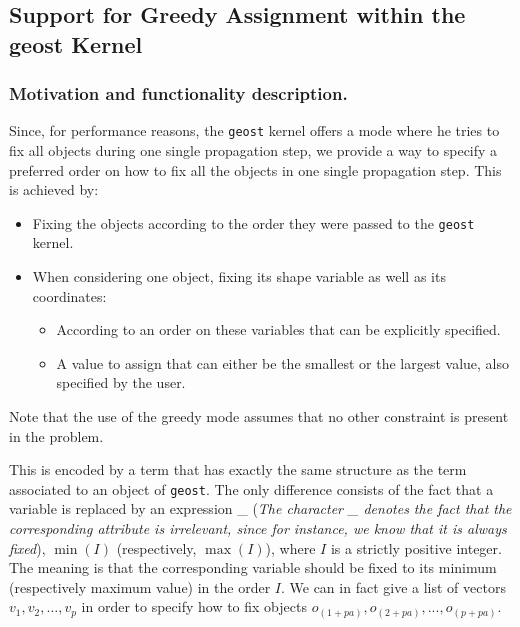 \subsection{Support for Greedy Assignment within the geost Kernel}\label{geostdescription:supportforgreedyassignmentwithinthegeostkernel}\hypertarget{geostdescription:supportforgreedyassignmentwithinthegeostkernel}{}

\subsubsection{Motivation and functionality description.}\label{geostdescription:motivationandfunctionalitydescription}\hypertarget{geostdescription:motivationandfunctionalitydescription}{}
Since, for performance reasons, the \texttt{geost} kernel offers a mode where he tries to fix all objects during one single propagation step, we provide a way to specify a preferred order on how to fix all the objects in one single propagation step. This is achieved by:
\begin{itemize}
	\item Fixing the objects according to the order they were passed to the \texttt{geost} kernel.
	\item When considering one object, fixing its shape variable as well as its coordinates:
	\begin{itemize}
		\item According to an order on these variables that can be explicitly specified.
		\item A value to assign that can either be the smallest or the largest value, also specified by the user.
	\end{itemize}
\end{itemize}

\begin{note}
Note that the use of the greedy mode assumes that no other constraint is present in the problem.
\end{note}

	This is encoded by a term that has exactly the same structure as the term associated to an object of  \texttt{geost}. The only difference consists of the fact that a variable is replaced by an expression \_ (\emph{The character \_ denotes the fact that the corresponding attribute is irrelevant, since for instance, we know that it is always fixed}), $\min(I)$ (respectively, $\max(I)$), where $I$ is a strictly positive integer. The meaning is that the corresponding variable should be fixed to its minimum (respectively maximum value) in the order $I$.   We can in fact give a list of vectors  $v_1,v_2,\ldots,v_p$ in order to specify how to fix objects $o_{(1+pa)},o_{(2+pa)},...,o_{(p+pa)}$.

